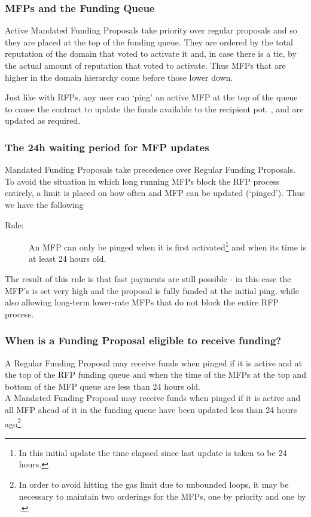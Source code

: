 \subsubsection*{MFPs and the Funding Queue}

Active Mandated Funding Proposals take priority over regular proposals and so they are placed at the top of the funding queue. They are ordered by the total reputation of the domain that voted to activate it and, in case there is a tie, by the actual amount of reputation that voted to activate. Thus MFPs that are higher in the domain hierarchy come before those lower down.

Just like with RFPs, any user can `ping' an active MFP at the top of the queue to cause the contract to update the funds available to the recipient pot. ,  and  are updated as required.

\subsubsection*{The 24h waiting period for MFP updates}
Mandated Funding Proposals take precedence over Regular Funding Proposals. To avoid the situation in which long running MFPs block the RFP process entirely, a limit is placed on how often and MFP can be updated (`pinged'). Thus we have the following
\begin{description}
 \item[Rule:] An MFP can only be pinged when it is first activated\footnote{In this initial update the time elapsed since last update is taken to be 24 hours.} and when its  time is at least 24 hours old.
\end{description}

The result of this rule is that fast payments are still possible - in this case the MFP's  is set very high and the proposal is fully funded at the initial ping, while also allowing long-term lower-rate MFPs that do not block the entire RFP process.

\subsubsection*{When is a Funding Proposal eligible to receive funding?}
A Regular Funding Proposal may receive funds when pinged if it is active and at the top of the RFP funding queue and when the  time of the MFPs at the top and bottom of the MFP queue are less than 24 hours old.\\
A Mandated Funding Proposal may receive funds when pinged if it is active and all MFP ahead of it in the funding queue have been updated less than 24 hours ago\footnote{In order to avoid hitting the gas limit due to unbounded loops, it may be necessary to maintain two orderings for the MFPs, one by priority and one by . }.

